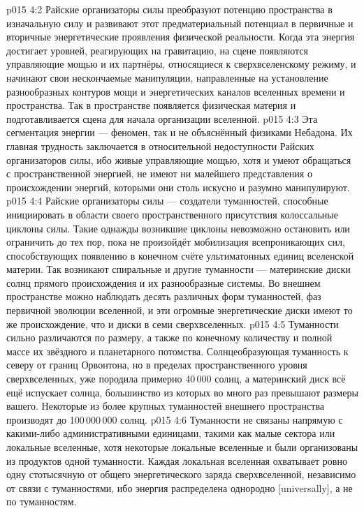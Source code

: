 \vs p015 4:2 Райские организаторы силы преобразуют потенцию пространства в изначальную силу и развивают этот предматериальный потенциал в первичные и вторичные энергетические проявления физической реальности. Когда эта энергия достигает уровней, реагирующих на гравитацию, на сцене появляются управляющие мощью и их партнёры, относящиеся к сверхвселенскому режиму, и начинают свои нескончаемые манипуляции, направленные на установление разнообразных контуров мощи и энергетических каналов вселенных времени и пространства. Так в пространстве появляется физическая материя и подготавливается сцена для начала организации вселенной.
\vs p015 4:3 Эта сегментация энергии --- феномен, так и не объяснённый физиками Небадона. Их главная трудность заключается в относительной недоступности Райских организаторов силы, ибо живые управляющие мощью, хотя и умеют обращаться с пространственной энергией, не имеют ни малейшего представления о происхождении энергий, которыми они столь искусно и разумно манипулируют.
\vs p015 4:4 \pc Райские организаторы силы --- создатели туманностей, способные инициировать в области своего пространственного присутствия колоссальные циклоны силы. Такие однажды возникшие циклоны невозможно остановить или ограничить до тех пор, пока не произойдёт мобилизация всепроникающих сил, способствующих появлению в конечном счёте ультиматонных единиц вселенской материи. Так возникают спиральные и другие туманности --- материнские диски солнц прямого происхождения и их разнообразные системы. Во внешнем пространстве можно наблюдать десять различных форм туманностей, фаз первичной эволюции вселенной, и эти огромные энергетические диски имеют то же происхождение, что и диски в семи сверхвселенных.
\vs p015 4:5 \pc Туманности сильно различаются по размеру, а также по конечному количеству и полной массе их звёздного и планетарного потомства. Солнцеобразующая туманность к северу от границ Орвонтона, но в пределах пространственного уровня сверхвселенных, уже породила примерно 40\,000 солнц, а материнский диск всё ещё испускает солнца, большинство из которых во много раз превышают размеры вашего. Некоторые из более крупных туманностей внешнего пространства производят до 100\,000\,000 солнц.
\vs p015 4:6 Туманности не связаны напрямую с какими\hyp{}либо административными единицами, такими как малые сектора или локальные вселенные, хотя некоторые локальные вселенные и были организованы из продуктов одной туманности. Каждая локальная вселенная охватывает ровно одну стотысячную от общего энергетического заряда сверхвселенной, независимо от связи с туманностями, ибо энергия распределена однородно [universally], а не по туманностям.
